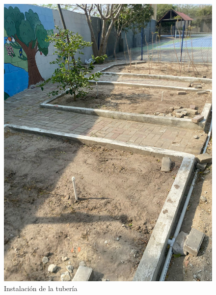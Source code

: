 \documentclass[12pt]{article}
\begin{document}
\begin{figure}[h!]
      \centering
      \begin{minipage}[b]{0.48\textwidth}
            \includegraphics[width=\textwidth]{imagenes/sprinkler2.jpg}
            \caption{Instalación de la tubería}
            \label{fig:sprinkler2}
      \end{minipage}
      \hfill
      \begin{minipage}[b]{0.48\textwidth}

\end{minipage}
\end{figure}
\end{document}
